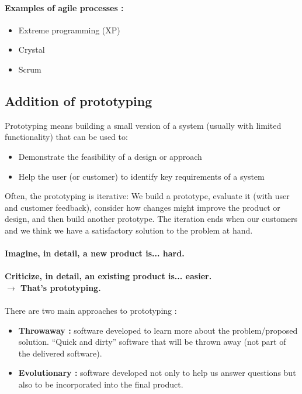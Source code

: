 \paragraph{Examples of agile processes :\\}

\begin{itemize}
    \item Extreme programming (XP)
    \item Crystal
    \item Scrum
\end{itemize}

\subsection{Addition of prototyping}

Prototyping means building a small version of a system (usually with limited
functionality) that can be used to:

\begin{itemize}
    \item Demonstrate the feasibility of a design or approach
    \item Help the user (or customer) to identify key requirements of a system
\end{itemize}


Often, the prototyping is iterative: We build a prototype, evaluate it (with
user and customer feedback), consider how changes might improve the product or
design, and then build another prototype. The iteration ends when our customers
and we think we have a satisfactory solution to the problem at hand.

\paragraph{Imagine, in detail, a new product is... hard.}
\paragraph{Criticize, in detail, an existing product is... easier.\\
 $\rightarrow$ That's prototyping.}

\paragraph{}

There are two main approaches to prototyping :

\begin{itemize}
    \item \textbf{Throwaway :} software developed to learn more about the
    problem/proposed solution. “Quick and dirty” software that will be thrown
    away (not part of the delivered software).
    \item \textbf{Evolutionary :} software developed not only to help us answer questions
    but also to be incorporated into the final product.
\end{itemize}
